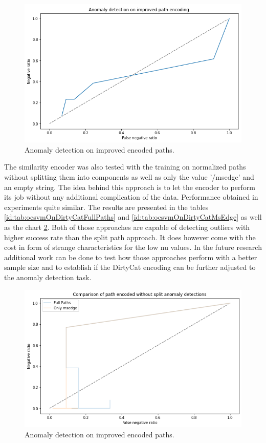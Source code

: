 \documentclass[a4paper,twoside,12pt]{book}
\begin{document}
\begin{figure}
	\centering
	\includegraphics[scale=0.9]{images/OcsvmOnDirtyCatGood}
	\caption{Anomaly detection on improved encoded paths.}
	\label{fig:ocsvmOnDirtyCatGood}
 \end{figure}

The similarity encoder was also tested with the training on normalized paths without splitting 
them into components as well as only the value '/msedge' and an empty string. The idea behind this approach
is to let the encoder to perform its job without any additional complication of the data. Performance obtained in
experiments quite similar. The results are presented in the tables \ref{id:tab:ocsvmOnDirtyCatFullPaths} 
and \ref{id:tab:ocsvmOnDirtyCatMsEdge} as well as the chart \ref{fig:ocsvmNoSplitComp}. Both of those approaches
are capable of detecting outliers with higher success rate than the split path approach. It does
however come with the cost in form of strange characteristics for the low nu values. In the future research 
additional work can be done to test how those approaches perform with a better sample size and to
establish if the DirtyCat encoding can be further adjusted to the anomaly detection task.

\begin{figure}
	\centering
	\includegraphics[scale=0.9]{images/OcsvmNoSplitComp}
	\caption{Anomaly detection on improved encoded paths.}
	\label{fig:ocsvmNoSplitComp}
 \end{figure}
 
\end{document}
